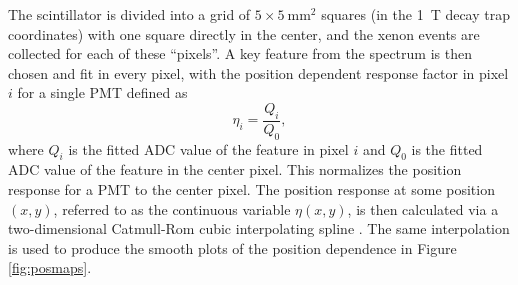 The scintillator is divided into a grid of $5\times5\mathrm{~mm}^2$ squares (in the 1~T
decay trap coordinates) with one square directly in the center,
and the xenon events are collected for each of these ``pixels''. A key feature
from the spectrum is then chosen and fit in every pixel, with the position dependent response
factor in pixel $i$ for a single PMT defined as
%
\begin{equation}
  \eta_i = \frac{Q_i}{Q_0},
\end{equation}
%
where $Q_i$ is the fitted ADC value of the feature in pixel $i$ and $Q_0$ is the fitted ADC value of the
feature in the center pixel. This normalizes the position response for a PMT to the center pixel. The
position response at some position $(x,y)$, referred to as the continuous variable $\eta(x,y)$,
is then calculated via a two-dimensional Catmull-Rom
cubic interpolating spline \cite{catmull1974}. The same interpolation is used to produce the smooth
plots of the
position dependence in Figure \ref{fig:posmaps}.


